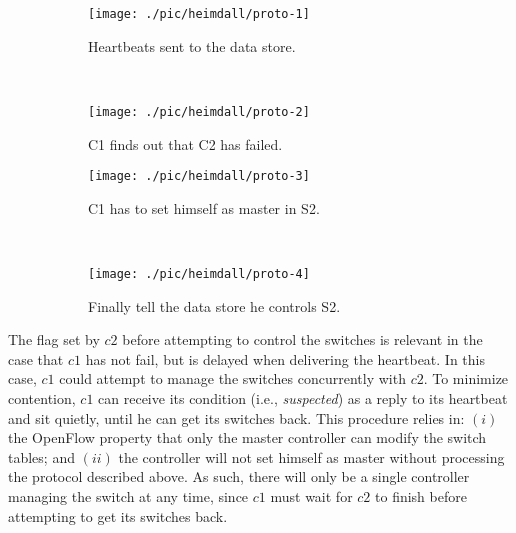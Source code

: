 \begin{figure}
  \centering
  \begin{subfigure}[b]{0.5\textwidth}
                \centering
                \texttt{[image: ./pic/heimdall/proto-1]}
                \caption{Heartbeats sent to the data store. }
                \label{fig:proto-heartbeats}
        \end{subfigure}%
        ~
        \begin{subfigure}[b]{0.5\textwidth}
                \centering
                \texttt{[image: ./pic/heimdall/proto-2]}
                \caption{C1 finds out that C2 has failed.}
                \label{fig:proto-c2-fails}
        \end{subfigure}

  \begin{subfigure}[b]{0.5\textwidth}
                \centering
                \texttt{[image: ./pic/heimdall/proto-3]}
                \caption{C1 has to set himself as master in S2.}
                \label{fig:proto-c1-as-master}
        \end{subfigure}%
        ~
        \begin{subfigure}[b]{0.5\textwidth}
                \centering
                \texttt{[image: ./pic/heimdall/proto-4]}
                \caption{Finally tell the data store he controls S2.}
                \label{fig:proto-c1-finishes}
        \end{subfigure}
\caption[Fault Tolerance in the Control Plane.]{}
\label{fig:design:fault-tolerance}
\end{figure}


The flag set by $c2$ before attempting to control the switches is relevant in the case that $c1$ has not fail, but is delayed when delivering the heartbeat. In this case, $c1$ could attempt to manage the switches concurrently with $c2$. To minimize contention, $c1$ can receive its condition (i.e., \emph{suspected}) as a reply to its heartbeat and sit quietly, until he can get its switches back. 
This procedure relies in: $(i)$ the OpenFlow property that only the master controller can modify the switch tables; and $(ii)$ the controller will not set himself as master without processing the protocol described above.
 As such, there will only be a single controller managing the switch at any time, since $c1$ must wait for $c2$ to finish before attempting to get its switches back.

